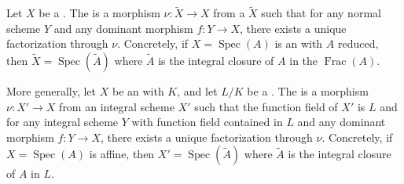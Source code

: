 \begin{definition} \label{definition:normalization_of_a_reduced_scheme}
    Let $X$ be a .
    The  is a morphism $\nu\colon \widetilde{X} \to X$ from a  $\widetilde{X}$ such that for any normal scheme $Y$ and any dominant morphism $f\colon Y \to X$, there exists a unique factorization through $\nu$. Concretely, if $X = \operatorname{Spec}(A)$ is an  with $A$ reduced, then $\widetilde{X} = \operatorname{Spec}(\widetilde{A})$ where $\widetilde{A}$ is the integral closure of $A$ in the  $\operatorname{Frac}(A)$.

    More generally, let $X$ be an  with  $K$, and let $L/K$ be a . The  is a morphism $\nu\colon X' \to X$ from an integral scheme $X'$ such that the function field of $X'$ is $L$ and for any integral scheme $Y$ with function field contained in $L$ and any dominant morphism $f\colon Y \to X$, there exists a unique factorization through $\nu$. Concretely, if $X = \operatorname{Spec}(A)$ is affine, then $X' = \operatorname{Spec}(\widetilde{A})$ where $\widetilde{A}$ is the integral closure of $A$ in $L$.
\end{definition}
